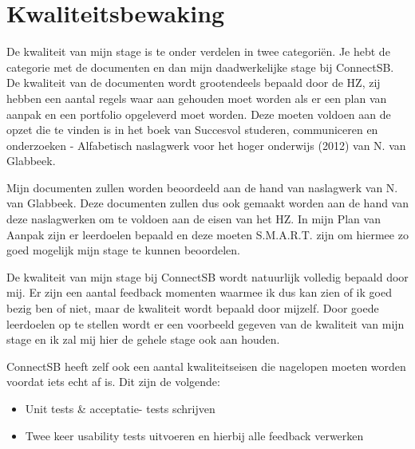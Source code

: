 
\section{Kwaliteitsbewaking}
De kwaliteit van mijn stage is te onder verdelen in twee categoriën. Je hebt de categorie met de documenten en dan mijn daadwerkelijke stage bij ConnectSB. De kwaliteit van de documenten wordt grootendeels bepaald door de HZ, zij hebben een aantal regels waar aan gehouden moet worden als er een plan van aanpak en een portfolio opgeleverd moet worden. Deze moeten voldoen aan de opzet die te vinden is in het boek van Succesvol studeren, communiceren en onderzoeken - Alfabetisch naslagwerk voor het hoger onderwijs (2012) van N. van Glabbeek.

Mijn documenten zullen worden beoordeeld aan de hand van naslagwerk van N. van Glabbeek. Deze documenten zullen dus ook gemaakt worden aan de hand van deze naslagwerken om te voldoen aan de eisen van het HZ. In mijn Plan van Aanpak zijn er leerdoelen bepaald en deze moeten S.M.A.R.T. zijn om hiermee zo goed mogelijk mijn stage te kunnen beoordelen.

De kwaliteit van mijn stage bij ConnectSB wordt natuurlijk volledig bepaald door mij. Er zijn een aantal feedback momenten waarmee ik dus kan zien of ik goed bezig ben of niet, maar de kwaliteit wordt bepaald door mijzelf. Door goede leerdoelen op te stellen wordt er een voorbeeld gegeven van de kwaliteit van mijn stage en ik zal mij hier de gehele stage ook aan houden.

ConnectSB heeft zelf ook een aantal kwaliteitseisen die nagelopen moeten worden voordat iets echt af is. Dit zijn de volgende:
\begin{itemize}
\item Unit tests & acceptatie- tests schrijven
\item Twee keer usability tests uitvoeren en hierbij alle feedback verwerken
\end{itemize}

\clearpage

